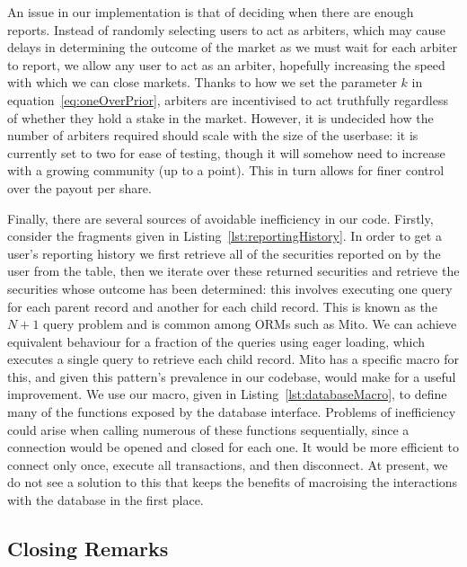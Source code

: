 An issue in our implementation is that of deciding when there are enough
reports. Instead of randomly selecting users to act as arbiters, which may
cause delays in determining the outcome of the market as we must wait for each
arbiter to report, we allow any user to act as an arbiter, hopefully increasing
the speed with which we can close markets. Thanks to how we set the parameter
$k$ in equation~\eqref{eq:oneOverPrior}, arbiters are incentivised to act
truthfully regardless of whether they hold a stake in the market. However, it
is undecided how the number of arbiters required should scale with the size of
the userbase: it is currently set to two for ease of testing, though it will
somehow need to increase with a growing community (up to a point). This in turn
allows for finer control over the payout per share.

Finally, there are several sources of avoidable inefficiency in our code.
Firstly, consider the fragments given in Listing~\ref{lst:reportingHistory}.
In order to get a user's reporting history we first retrieve all of the
securities reported on by the user from the  table, then we
iterate over these returned securities and retrieve the securities whose
outcome has been determined: this involves executing one query for each parent
record and another for each child record. This is known as the $N+1$ query
problem and is common among ORMs such as Mito. We can achieve equivalent
behaviour for a fraction of the queries using eager loading, which executes a
single query to retrieve each child record. Mito has a specific macro for this,
and given this pattern's prevalence in our codebase, would make for a useful
improvement. We use our  macro, given in
Listing~\ref{lst:databaseMacro}, to define many of the functions exposed by the
database interface. Problems of inefficiency could arise when calling numerous
of these functions sequentially, since a connection would be opened and closed
for each one. It would be more efficient to connect only once, execute all
transactions, and then disconnect. At present, we do not see a solution to this
that keeps the benefits of macroising the interactions with the database in the
first place.

\subsection{Closing Remarks}

